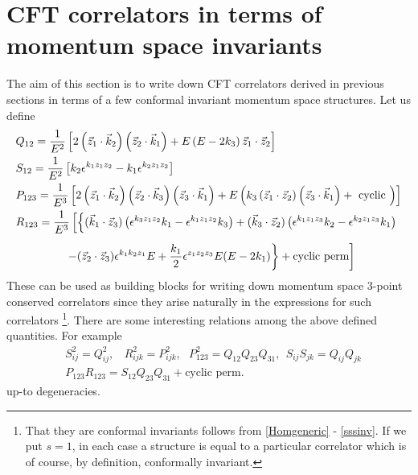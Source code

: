 \documentclass[a4paper,11pt]{article}
\begin{document}

\section{CFT correlators in terms of momentum space invariants}\label{INV}
The aim of this section is to write down CFT correlators derived in previous sections in terms of a few conformal invariant momentum space structures. Let us define  
\begin{align}
    &Q_{12} = \frac{1}{E^{2}}\left[2\left(\vec{z}_{1} \cdot \vec{k}_{2}\right)\left(\vec{z}_{2} \cdot \vec{k}_{1}\right)+E\left(E-2 k_{3}\right) \vec{z}_{1} \cdot \vec{z}_{2}\right]\label{Q12defn}\\
    &S_{12} = \frac{1}{E^{2}}\left[k_{2} \epsilon^{k_{1} z_{1} z_{2}}-k_{1} \epsilon^{k_{2} z_{1} z_{2}}\right]\\
   &P_{123}=\frac{1}{E^{3}}\left[2\left(\vec{z}_{1} \cdot \vec{k}_{2}\right)\left(\vec{z}_{2} \cdot \vec{k}_{3}\right)\left(\vec{z}_{3} \cdot \vec{k}_{1}\right)+E\left(k_{3}\left(\vec{z}_{1} \cdot \vec{z}_{2}\right)\left(\vec{z}_{3} \cdot \vec{k}_{1}\right)+\text { cyclic }\right)\right]\\
   &R_{123} = \frac{1}{E^3}\left[\left\{(\vec{k}_1 \cdot \vec{z}_3)\left(\epsilon^{k_3 z_1 z_2}k_1-\epsilon^{k_1 z_1 z_2}k_3\right)+(\vec{k}_3 \cdot \vec{z}_2)\left(\epsilon^{k_1 z_1 z_3}k_2-\epsilon^{k_2 z_1 z_3}k_1\right)\right.\right.\nonumber\\[5 pt]
&\hspace{1.5cm}\left.\left.-(\vec{z}_2 \cdot \vec{z}_3)\epsilon^{k_1 k_2 z_1}E+\frac{k_1}{2} \epsilon^{z_1 z_2 z_3}E(E-2k_1)\right\}+\text{cyclic perm}\right]
\end{align}
These can be used as building blocks for writing down momentum space 3-point conserved correlators since they arise naturally in the expressions for such correlators \footnote{That they are conformal invariants follows from \eqref{Homgeneric} - \eqref{sssinv}. If we put $s=1$, in each case a structure is equal to a particular correlator which is of course, by definition, conformally invariant.}. There are some interesting relations among the above defined quantities. For example
\begin{align}\label{invariantstructurerelations}
   & S_{ij}^2 = Q_{ij}^2,~~~~R_{ijk}^2= P_{ijk}^2,~~~P_{123}^2 = Q_{12} Q_{23} Q_{31},~~S_{ij}S_{jk} = Q_{ij}Q_{jk}\nonumber\\[5 pt]
   & P_{123} R_{123} = S_{12} Q_{23} Q_{31} + \text{cyclic perm.}
\end{align} up-to degeneracies.
\end{document}
